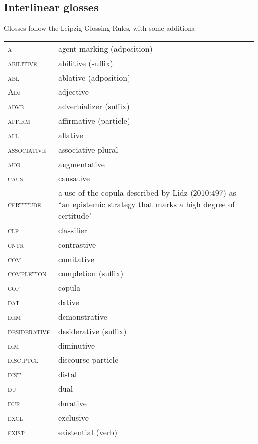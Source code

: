 

\begin{refsection}
	
\section*{Interlinear glosses}
\label{sec:glosses}

Glosses follow the Leipzig Glossing Rules, with some additions.

\begin{table}[H]
{%
\begin{tabularx}{\textwidth}{ @{}l Q } 
	\textsc{a} & agent marking (adposition)\\
	\textsc{abilitive} & abilitive (suffix)\\
	\textsc{abl} & ablative (adposition)\\
	\textsc{Adj} & adjective\\
	\textsc{advb} & adverbializer (suffix)\\
	\textsc{affirm} & affirmative (particle)\\
	\textsc{all} & allative\\
	\textsc{associative} & associative plural\\
	\textsc{aug} & augmentative\\
	\textsc{caus} & causative\\
	\textsc{certitude} & a use of the copula described by Lidz (2010:497) as ``an epistemic strategy that marks a high degree of certitude"\\
	\textsc{clf} & classifier\\
	\textsc{cntr} & contrastive\\
	\textsc{com} & comitative\\
	\textsc{completion} & completion (suffix)\\
	\textsc{cop} & copula\\
   \textsc{dat} & dative\\
   \textsc{dem} & demonstrative\\
	\textsc{desiderative} & desiderative (suffix)\\
	\textsc{dim} & diminutive\\
	\textsc{disc.ptcl} & discourse particle\\
	\textsc{dist} & distal\\
	\textsc{du} & dual\\
	\textsc{dur} & durative\\
	\textsc{excl} & exclusive\\
	\textsc{exist} & existential (verb)\\
	\end{tabularx}}
\end{table}


\end{refsection}
